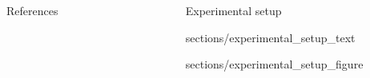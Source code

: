 \documentclass[final,20pt]{beamer}
\newlength{\sepwid}
\newlength{\onecolwid}
\newlength{\twocolwid}
\begin{document}
\begin{frame}[t]
\begin{columns}[t]
\begin{column}{\twocolwid}
\begin{columns}[t, totalwidth=\twocolwid]
		\begin{column}{\onecolwid}

			\vspace{-3.5cm}


			\begin{block}{References}

			\nocite{*} %
			\small{
			}

			\end{block}

		\end{column}

	\end{columns}

	\endminipage

\end{column}

\begin{column}{\sepwid}\end{column} %

\begin{column}{\twocolwid}


\begin{block}{Experimental setup}

{sections/experimental_setup_text}

\vspace{1cm}

{sections/experimental_setup_figure}

\end{block}


\vspace{-1cm}



\end{column}
\end{columns}
\end{frame}
\end{document}
